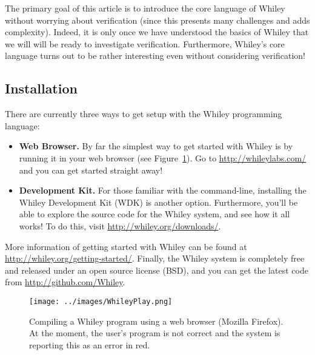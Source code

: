 The primary goal of this article is to introduce the core language of
Whiley without worrying about verification (since this presents many
challenges and adds complexity).  Indeed, it is only once we have
understood the basics of Whiley that we will will be ready to
investigate verification.  Furthermore, Whiley's core language turns
out to be rather interesting even without considering verification!

\subsection{Installation}

There are currently three ways to get setup with the Whiley
programming language:

\begin{itemize}
\item {\bf Web Browser.} By far the simplest way to get started with
  Whiley is by running it in your web browser (see
  Figure~\ref{whileyplay}).  Go to \url{http://whileylabs.com/} and
  you can get started straight away!
\item {\bf Development Kit.} For those familiar with the command-line,
  installing the Whiley Development Kit (WDK) is another option.
  Furthermore, you'll be able to explore the source code for the
  Whiley system, and see how it all works!  To do this, visit
  \url{http://whiley.org/downloads/}.
\end{itemize}

More information of getting started with Whiley can be found at
\url{http://whiley.org/getting-started/}.  Finally, the Whiley system
is completely free and released under an open source license (BSD),
and you can get the latest code from \url{http://github.com/Whiley}.

\begin{figure}[!t]
\centering
\texttt{[image: ../images/WhileyPlay.png]}
\caption{Compiling a Whiley program using a web browser (Mozilla
  Firefox).  At the moment, the user's program is not correct and the
  system is reporting this as an error in red.}
\label{whileyplay}
\end{figure}



